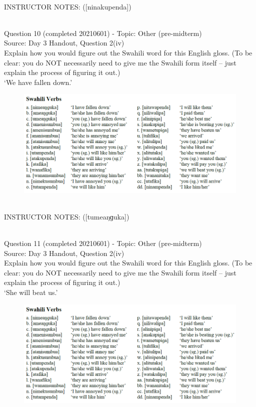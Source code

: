 \documentclass[12pt]{article}
\begin{document}
~\\
INSTRUCTOR NOTES: ([ninakupenda])


~\\

{\large Question 10} (completed 20210601) - Topic: Other (pre-midterm)\\
Source: Day 3 Handout, Question 2(iv)\\

Explain how you would figure out the Swahili word for this English gloss. (To be clear: you do NOT necessarily need to give me the Swahili form itself -- just explain the process of figuring it out.)\\

‘We have fallen down.’

\begin{figure}[H]
\includegraphics{../images/swahiliverbs.png}
\end{figure}

~\\
INSTRUCTOR NOTES: ([tumeaŋɡuka])


~\\

{\large Question 11} (completed 20210601) - Topic: Other (pre-midterm)\\
Source: Day 3 Handout, Question 2(iv)\\

Explain how you would figure out the Swahili word for this English gloss. (To be clear: you do NOT necessarily need to give me the Swahili form itself -- just explain the process of figuring it out.)\\

‘She will beat us.’

\begin{figure}[H]
\includegraphics{../images/swahiliverbs.png}
\end{figure}
\end{document}
